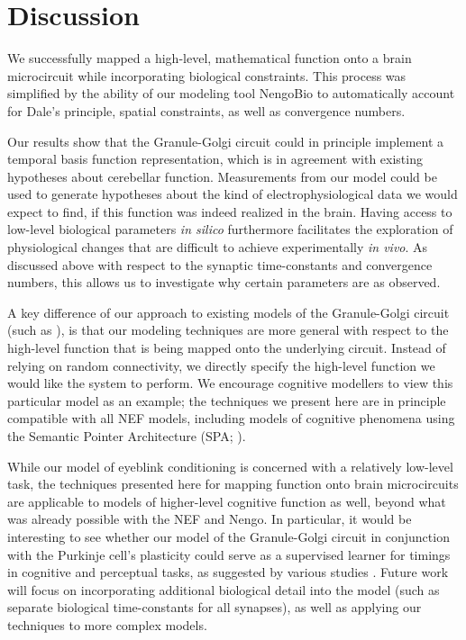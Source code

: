 
\section{Discussion}

We successfully mapped a high-level, mathematical function onto a brain microcircuit while incorporating biological constraints.
This process was simplified by the ability of our modeling tool NengoBio to automatically account for Dale's principle, spatial constraints, as well as convergence numbers.

Our results show that the Granule-Golgi circuit could in principle implement a temporal basis function representation, which is in agreement with existing hypotheses about cerebellar function.
Measurements from our model could be used to generate hypotheses about the kind of electrophysiological data we would expect to find, if this function was indeed realized in the brain.
Having access to low-level biological parameters \emph{in silico} furthermore facilitates the exploration of physiological changes that are difficult to achieve experimentally \emph{in vivo}. As discussed above with respect to the synaptic time-constants and convergence numbers, this allows us to investigate why certain parameters are as observed.

A key difference of our approach to existing models of the Granule-Golgi circuit (such as \cite{rossert2015edge}), is that our modeling techniques are more general with respect to the high-level function that is being mapped onto the underlying circuit.
Instead of relying on random connectivity, we directly specify the high-level function we would like the system to perform.
We encourage cognitive modellers to view this particular model as an example; the techniques we present here are in principle compatible with all NEF models, including models of cognitive phenomena using the Semantic Pointer Architecture (SPA; \cite{eliasmith2013how}).

While our model of eyeblink conditioning is concerned with a relatively low-level task, the techniques presented here for mapping function onto brain microcircuits are applicable to models of higher-level cognitive function as well, beyond what was already possible with the NEF and Nengo.
In particular, it would be interesting to see whether our model of the Granule-Golgi circuit in conjunction with the Purkinje cell's plasticity could serve as a supervised learner for timings in cognitive and perceptual tasks, as suggested by various studies \citep{oreilly2008cerebellum,e2014metaanalysis}.  Future work will focus on incorporating additional biological detail into the model (such as separate biological time-constants for all synapses), as well as applying our techniques to more complex models.

